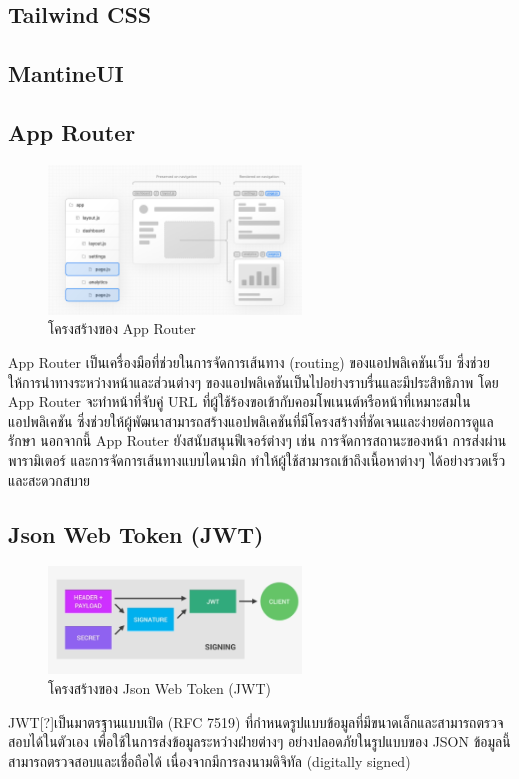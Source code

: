   \subsection{Tailwind CSS}
  \subsection{MantineUI}

  \subsection{App Router}
    \begin{figure}[!h]
      \centering
      \includegraphics[width=0.6\textwidth]{image/Background/app-router.png}
      \caption[App Router]{โครงสร้างของ App Router}
      \label{fig:app_router_pic}
    \end{figure}
    \FloatBarrier
    \qquad App Router เป็นเครื่องมือที่ช่วยในการจัดการเส้นทาง (routing) ของแอปพลิเคชันเว็บ ซึ่งช่วยให้การนำทางระหว่างหน้าและส่วนต่างๆ ของแอปพลิเคชันเป็นไปอย่างราบรื่นและมีประสิทธิภาพ โดย App Router จะทำหน้าที่จับคู่ URL ที่ผู้ใช้ร้องขอเข้ากับคอมโพเนนต์หรือหน้าที่เหมาะสมในแอปพลิเคชัน ซึ่งช่วยให้ผู้พัฒนาสามารถสร้างแอปพลิเคชันที่มีโครงสร้างที่ชัดเจนและง่ายต่อการดูแลรักษา นอกจากนี้ App Router ยังสนับสนุนฟีเจอร์ต่างๆ เช่น การจัดการสถานะของหน้า การส่งผ่านพารามิเตอร์ และการจัดการเส้นทางแบบไดนามิก ทำให้ผู้ใช้สามารถเข้าถึงเนื้อหาต่างๆ ได้อย่างรวดเร็วและสะดวกสบาย

  \subsection{Json Web Token (JWT)}
    \begin{figure}[!h]
      \centering
      \includegraphics[width=0.6\textwidth]{image/Background/JWT.png}
      \caption[JWT]{โครงสร้างของ Json Web Token (JWT)}
      \label{fig:jwt_pic}
    \end{figure}
    \FloatBarrier
    \qquad JWT[?]เป็นมาตรฐานแบบเปิด (RFC 7519) ที่กําหนดรูปแบบข้อมูลที่มีขนาดเล็กและสามารถตรวจสอบได้ในตัวเอง เพื่อใช้ในการส่งข้อมูลระหว่างฝ่ายต่างๆ อย่างปลอดภัยในรูปแบบของ JSON ข้อมูลนี้สามารถตรวจสอบและเชื่อถือได้ เนื่องจากมีการลงนามดิจิทัล (digitally signed)

